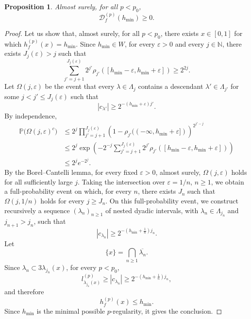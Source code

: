 \documentclass[a4paper,11pt,oneside]{article}
\newcommand{\ccint}[1]{\left[{#1}\right]}
\theoremstyle{definition}
\theoremstyle{plain}
\newtheorem{prop}[defi]{Proposition}
\begin{document}
\begin{prop}\label{palier}
Almost surely, for all $p<p_0$,
\[
\mathscr{D}_f^{(p)}(h_{\min})\geq 0.
\]
\end{prop}

\begin{proof}
Let us show that, almost surely, for all $p<p_0$, there exists $x\in\ccint{0,1}$ for which \mbox{$h_f^{(p)}(x)=h_{\min}$}. 
Since $h_{\min}\in W$, for every $\varepsilon>0$ and every $j\in\mathbb N$,
there exists $J_j(\varepsilon)>j$ such that
\[
\sum_{j'=j+1}^{J_j(\varepsilon)}
2^{j'}\rho_{j'}([h_{\min}-\varepsilon,h_{\min}+\varepsilon])
\geq 2^{2j}.
\]
Let $\Omega(j,\varepsilon)$ be the event that every
$\lambda\in\Lambda_j$ contains a descendant $\lambda'\in\Lambda_{j'}$
for some $j<j'\leq J_j(\varepsilon)$ such that
\[
|c_{\lambda'}|\geq 2^{-(h_{\min}+\varepsilon)j'}.
\]
By independence,
\[
\begin{aligned}
\mathbb P\bigl(\Omega(j,\varepsilon)^c\bigr)
&\leq
2^j
\prod_{j'=j+1}^{J_j(\varepsilon)}
\left(
1-\rho_{j'}((-\infty,h_{\min}+\varepsilon])
\right)^{2^{j'-j}}\\
&\leq
2^j\exp\left(
-2^{-j}
\sum_{j'=j+1}^{J_j(\varepsilon)}
2^{j'}\rho_{j'}([h_{\min}-\varepsilon,h_{\min}+\varepsilon])
\right)\\
&\leq
2^j e^{-2^j}.
\end{aligned}
\]
By the Borel--Cantelli lemma, for every fixed $\varepsilon>0$,
almost surely, $\Omega(j,\varepsilon)$ holds for all sufficiently large $j$.
Taking the intersection over $\varepsilon=1/n$, $n\geq1$, we obtain a
full-probability event on which, for every $n$, there exists $J_n$ such that
$\Omega(j,1/n)$ holds for every $j\geq J_n$.
On this full-probability event, we construct recursively a sequence $(\lambda_n)_{n\geq1}$ of nested dyadic intervals, with $\lambda_n\in\Lambda_{j_n}$ and $j_{n+1}>j_n$, such that 
\[
|c_{\lambda_n}|\geq 2^{-\left(h_{\min}+\frac{1}{n}\right)j_n}.
\]
Let
\[
\{x\}=\bigcap_{n\geq1}\overline{\lambda_n}.
\]
Since $\lambda_n\subset 3\lambda_{j_n}(x)$, for every $p<p_0$,
\[
l_{\lambda_{j_n}(x)}^{(p)}
\geq |c_{\lambda_n}|
\geq 2^{-\left(h_{\min}+\frac{1}{n}\right)j_n},
\]
and therefore
\[
h_f^{(p)}(x)\leq h_{\min}.
\]
Since $h_{\min}$ is the minimal possible $p$-regularity, it gives the conclusion.
\end{proof}
\end{document}
